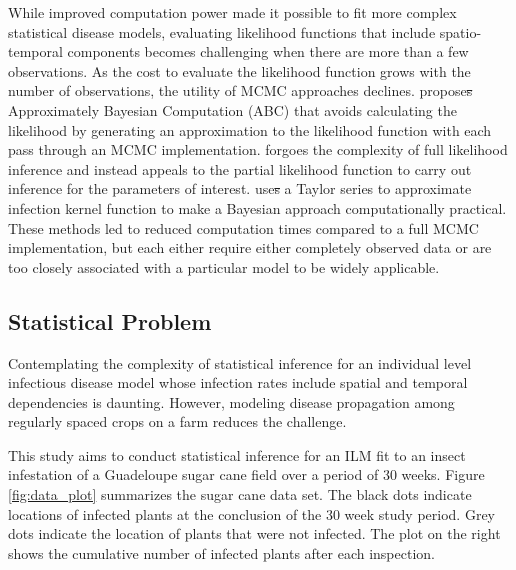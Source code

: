 \documentclass{uwstat572}
\newcommand{\vmdel}[1]{\sout{#1}}
\begin{document}
While improved computation power made it possible to fit more complex statistical disease models, evaluating likelihood functions that include spatio-temporal components becomes challenging when there are more than a few observations. 
As the cost to evaluate the likelihood function grows with the number of observations, the utility of MCMC approaches declines.
\citet{McKinley} propose\vmdel{s} Approximately Bayesian Computation (ABC) that avoids calculating the likelihood by generating an approximation to the likelihood function with each pass through an MCMC implementation. 
\citet{Diggle} forgoes the complexity of full likelihood inference and instead appeals to the partial likelihood function to carry out inference for the parameters of interest. 
\citet{Deardon} use\vmdel{s} a Taylor series to approximate infection kernel function to make a Bayesian approach computationally practical. 
These methods led to reduced computation times compared to a full MCMC implementation, but each either require either completely observed data or are too closely associated with a particular model to be widely applicable.

\subsection{Statistical Problem}
Contemplating the complexity of statistical inference for an individual level infectious disease model whose infection rates include spatial and temporal dependencies is daunting.
However, modeling disease propagation among regularly spaced crops on a farm reduces the challenge. 

This study aims to conduct statistical inference for an ILM fit to an insect infestation of a Guadeloupe sugar cane field over a period of 30 weeks.
Figure \ref{fig:data_plot} summarizes the sugar cane data set. 
The black dots indicate locations of infected plants at the conclusion of the 30 week study period. 
Grey dots indicate the location of plants that were not infected. 
The plot on the right shows the cumulative number of infected plants after each inspection.
\end{document}
